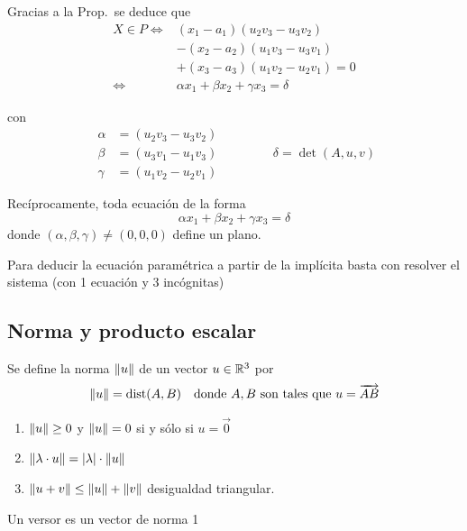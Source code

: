 \documentclass[11pt,a4paper]{article}
\DeclareMathOperator{\dist}{dist}
\begin{document}
Gracias a la Prop.\ se deduce que
\[
\begin{aligned}
X\in P\iff{}&(x_1-a_1)(u_2v_3-u_3v_2)\\
&-(x_2-a_2)(u_1v_3-u_3v_1)\\
&+(x_3-a_3)(u_1v_2-u_2v_1)=0\\
\iff{}&\alpha x_1+\beta x_2+\gamma x_3=\delta
\end{aligned}
\]

con
\[
\begin{aligned}
\alpha&=(u_2v_3-u_3v_2)\\
\beta&=(u_3v_1-u_1v_3)\\
\gamma&=(u_1v_2-u_2v_1)
\end{aligned}
\qquad\qquad
\delta=\det(A,u,v)
\]

Recíprocamente, toda ecuación de la forma
\[
\alpha x_1+\beta x_2+\gamma x_3=\delta
\]
donde $(\alpha,\beta,\gamma)\neq(0,0,0)$ define un plano.

\begin{observacion}
Para deducir la ecuación paramétrica a partir de la implícita basta con resolver el sistema (con 1 ecuación y 3 incógnitas)
\end{observacion}

\subsection{Norma y producto escalar}

\begin{definicion}
Se define la norma $\lVert u\rVert$ de un vector $u\in\mathbb{R}^3$ por
\[
\norm{u}=\dist(A,B)\quad\text{donde } A,B \text{ son tales que } u=\overrightarrow{AB}
\]
\end{definicion}

\begin{proposicion}\leavevmode
\begin{enumerate}[label=(\arabic*)]
  \item $\lVert u\rVert\geq0$ y $\lVert u\rVert=0$ si y sólo si $u=\vec0$
  \item $\lVert\lambda\cdot u\rVert=\lvert\lambda\rvert\cdot\lVert u\rVert$
  \item $\lVert u+v\rVert\leq\lVert u\rVert+\lVert v\rVert$ \quad desigualdad triangular.
\end{enumerate}
\end{proposicion}

\begin{definicion}
Un versor es un vector de norma 1
\end{definicion}
\end{document}
